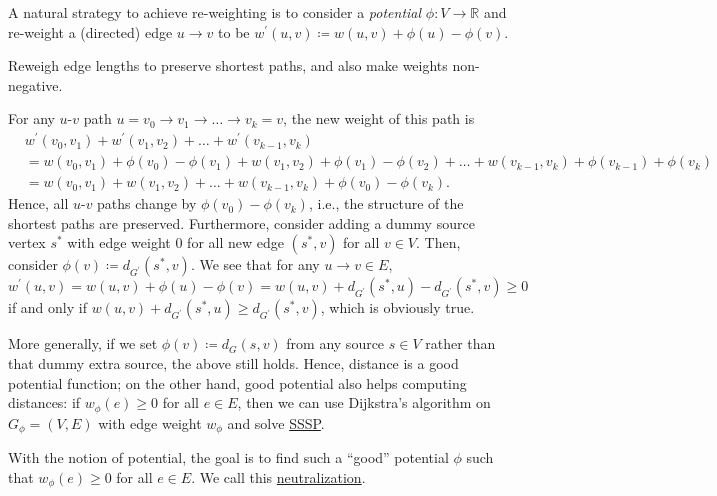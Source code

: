 \begin{prev}\label{prev:Johnson-algorithm}
	A natural strategy to achieve re-weighting is to consider a \emph{potential} \(\phi \colon V \to \mathbb{R} \) and re-weight a (directed) edge \(u \to v\) to be \(w^{\prime} (u, v)\coloneqq w(u, v) + \phi (u) - \phi (v)\).
	\begin{intuition}
		Reweigh edge lengths to preserve shortest paths, and also make weights non-negative.
	\end{intuition}
	For any \(u\)-\(v\) path \(u = v_0 \to v_1 \to \dots \to v_k = v\), the new weight of this path is
	\[
		\begin{split}
			 & w^{\prime} (v_0, v_1 ) + w^{\prime} (v_1, v_2) + \dots + w^{\prime} (v_{k-1}, v_k)                                                      \\
			 & = w(v_0, v_1) + \phi (v_0) - \phi (v_1) + w(v_1, v_2) + \phi (v_1) - \phi (v_2) + \dots + w(v_{k-1}, v_k) + \phi (v_{k-1}) + \phi (v_k) \\
			 & = w(v_0, v_1) + w(v_1, v_2) + \dots + w(v_{k-1}, v_{k}) + \phi (v_0) - \phi (v_k).
		\end{split}
	\]
	Hence, all \(u\)-\(v\) paths change by \(\phi (v_0) - \phi (v_k)\), i.e., the structure of the shortest paths are preserved. Furthermore, consider adding a dummy source vertex \(s^{\ast} \) with edge weight \(0\) for all new edge \((s^{\ast} , v)\) for all \(v \in V\). Then, consider \(\phi (v) \coloneqq d_{G^{\prime} }(s^{\ast} , v)\). We see that for any \(u \to v \in E\),
	\[
		w^{\prime} (u, v) = w(u, v) + \phi (u) - \phi (v) = w(u, v) + d_{G^{\prime} }(s^{\ast} , u) - d_{G^{\prime} }(s^{\ast} , v) \geq 0
	\]
	if and only if \(w(u, v) + d_{G^{\prime} }(s^{\ast} , u) \geq d_{G^{\prime} }(s^{\ast} , v)\), which is obviously true.

	\begin{center}
	\end{center}
	More generally, if we set \(\phi (v) \coloneqq d_G(s, v)\) from any source \(s \in V\) rather than that dummy extra source, the above still holds. Hence, distance is a good potential function; on the other hand, good potential also helps computing distances: if \(w_{\phi } (e) \geq 0\) for all \(e \in E\), then we can use Dijkstra's algorithm on \(G_{\phi } = (V, E)\) with edge weight \(w_{\phi }\) and solve \hyperref[prb:SSSP]{SSSP}.
\end{prev}

With the notion of potential, the goal is to find such a ``good'' potential \(\phi \) such that \(w_{\phi }(e) \geq 0\) for all \(e \in E\). We call this \hyperref[def:neutralize]{neutralization}.

